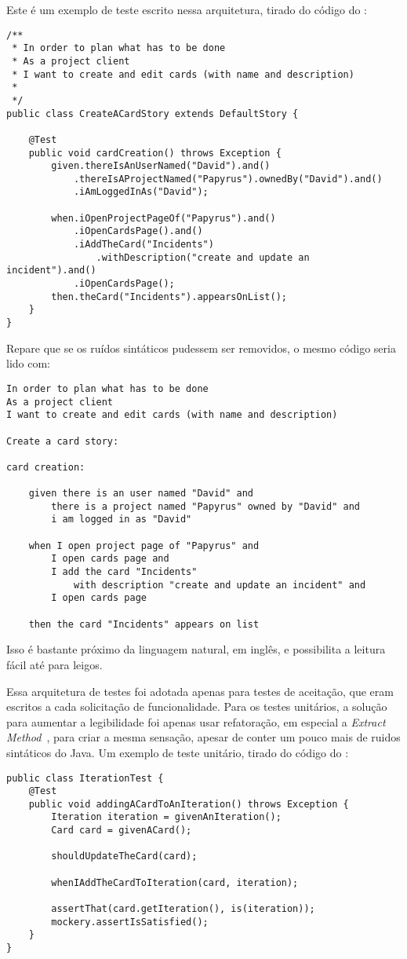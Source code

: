 Este é um exemplo de teste escrito nessa arquitetura, tirado do código do \calopsita{}:

\begin{lstlisting}
/**
 * In order to plan what has to be done
 * As a project client
 * I want to create and edit cards (with name and description)
 *
 */
public class CreateACardStory extends DefaultStory {

	@Test
	public void cardCreation() throws Exception {
		given.thereIsAnUserNamed("David").and()
			.thereIsAProjectNamed("Papyrus").ownedBy("David").and()
			.iAmLoggedInAs("David");

		when.iOpenProjectPageOf("Papyrus").and()
		    .iOpenCardsPage().and()
			.iAddTheCard("Incidents")
				.withDescription("create and update an incident").and()
			.iOpenCardsPage();
		then.theCard("Incidents").appearsOnList();
	}
}
\end{lstlisting}

Repare que se os ruídos sintáticos pudessem ser removidos, o mesmo código seria lido com:

\begin{verbatim}
In order to plan what has to be done
As a project client
I want to create and edit cards (with name and description)

Create a card story:

card creation:
	
	given there is an user named "David" and
		there is a project named "Papyrus" owned by "David" and
		i am logged in as "David"

	when I open project page of "Papyrus" and
		I open cards page and
		I add the card "Incidents" 
			with description "create and update an incident" and
		I open cards page
			
	then the card "Incidents" appears on list
\end{verbatim}

Isso é bastante próximo da linguagem natural, em inglês, e possibilita a leitura fácil até para leigos.

Essa arquitetura de testes foi adotada apenas para testes de aceitação, que eram escritos a cada solicitação de funcionalidade. Para os testes unitários, a solução para aumentar a legibilidade foi  apenas usar refatoração, em especial a \textit{Extract Method}~\cite{refactoring}, para criar a mesma sensação, apesar de conter um pouco mais de ruidos sintáticos do Java. Um exemplo de teste unitário, tirado do código do \calopsita{}:

\begin{lstlisting}
public class IterationTest {
	@Test
	public void addingACardToAnIteration() throws Exception {
		Iteration iteration = givenAnIteration();
		Card card = givenACard();

		shouldUpdateTheCard(card);

		whenIAddTheCardToIteration(card, iteration);

		assertThat(card.getIteration(), is(iteration));
		mockery.assertIsSatisfied();
	}
}
\end{lstlisting}

